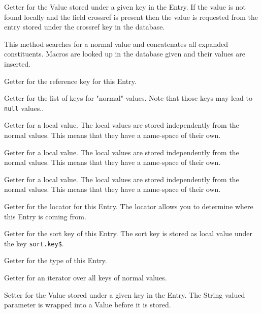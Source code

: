 \begin{methods}
    Getter for the Value stored under a given key in the Entry. If the
    value is not found locally and the field crossref is present then
    the value is requested from the entry stored under the crossref key
    in the database.

    This method searches for a normal value and concatenates all
    expanded constituents. Macros are looked up in the database given and
    their values are inserted.

    Getter for the reference key for this Entry.

    Getter for the list of keys for "normal" values. Note that those keys may
    lead to \texttt{null} values..

    Getter for a local value. The local values are stored independently from
    the normal values. This means that they have a name-space of their own.

    Getter for a local value. The local values are stored independently from
    the normal values. This means that they have a name-space of their own.

    Getter for a local value. The local values are stored independently from
    the normal values. This means that they have a name-space of their own.

    Getter for the locator for this Entry. The locator allows you to
    determine where this Entry is coming from.

    Getter for the sort key of this Entry. The sort key is stored as local
    value under the key \texttt{sort.key\$}.

    Getter for the type of this Entry.

    Getter for an iterator over all keys of normal values.

    Setter for the Value stored under a given key in the Entry. The String
    valued parameter is wrapped into a  Value before it is stored.


\end{methods}
